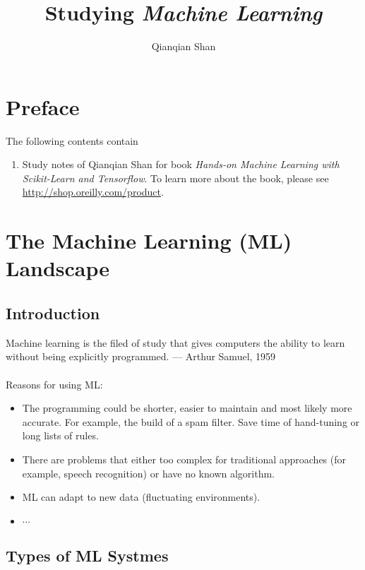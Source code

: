 \documentclass[12pt,oneside,a4paper]{article}
\author{Qianqian Shan}
\title{Studying \emph{Machine Learning}}
\date{\vspace{-5ex}}
\numberwithin{equation}{section}
\begin{document}
\maketitle
\tableofcontents

\section*{Preface}
The following contents contain 
\begin{enumerate}
\item Study notes of Qianqian Shan for book \emph{Hands-on Machine Learning with Scikit-Learn and Tensorflow}. To learn more about the book, please see \\ \href{http://shop.oreilly.com/product/0636920052289.do}{http://shop.oreilly.com/product}. 
\end{enumerate}
 

\section{The Machine Learning (ML) Landscape}

\subsection{Introduction}
Machine learning is the filed of study that gives computers the ability to learn without being explicitly programmed. --- Arthur Samuel, 1959\\~\\

Reasons for using ML: 
\begin{itemize}
\item The programming could be shorter, easier to maintain and most likely more accurate. For example, the build of a spam filter. Save time of hand-tuning or long lists of rules.
\item There are problems that either too complex for traditional approaches (for example, speech recognition) or have no known algorithm. 

\item ML can adapt to new data (fluctuating environments). 
\item $\cdots$
\end{itemize}
\subsection{Types of ML Systmes} 
\end{document}
